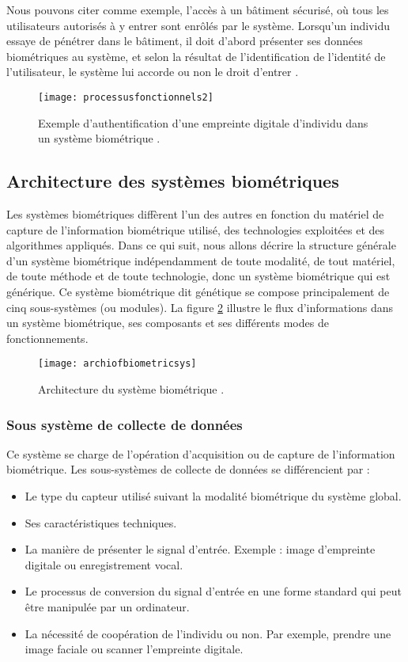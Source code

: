 \begin{itemize}
	Nous pouvons citer comme exemple, l’accès à un bâtiment sécurisé, où tous les utilisateurs autorisés à y entrer sont enrôlés par le système. Lorsqu’un individu essaye de pénétrer dans le bâtiment, il doit d’abord présenter ses données biométriques au système, et selon la résultat de l'identification de l’identité de l’utilisateur, le système lui accorde ou non le droit d’entrer \citep{meyer2009}.
	\begin{figure}[H]
		\centering
		\texttt{[image: processusfonctionnels2]}
		\caption{Exemple d'authentification d’une empreinte digitale d'individu dans un système biométrique \citep{meyer2009}.}
		\label{fig:chapitre1identification}
	\end{figure}
	
\end{itemize}
\subsection{Architecture des systèmes biométriques}
Les systèmes biométriques diffèrent l'un des autres en fonction du matériel de capture de l'information biométrique utilisé, des technologies exploitées et des algorithmes appliqués. 
Dans ce qui suit, nous allons décrire la structure générale d’un système biométrique indépendamment de toute modalité, de tout matériel, de toute méthode et de toute technologie, donc un système biométrique qui est générique. Ce système biométrique dit génétique se compose principalement de cinq sous-systèmes (ou modules)\citep{iso2006iec}. La figure \ref{fig:archiofbiometricsys} illustre le flux d'informations dans un système biométrique, ses composants et ses différents modes de fonctionnements.
\begin{figure}[H]
	\centering
	\texttt{[image: archiofbiometricsys]}
	\caption{Architecture du système biométrique \citep{iso2006iec}.}
	\label{fig:archiofbiometricsys}
\end{figure}
\subsubsection{Sous système de collecte de données }
Ce système se charge de l’opération d’acquisition ou de capture de l'information biométrique. Les sous-systèmes de collecte de données se différencient par :
\begin{itemize}
	\item Le type du capteur utilisé suivant la modalité biométrique du système global.
	\item Ses caractéristiques techniques.
	\item La manière de présenter le signal d’entrée. Exemple : image d’empreinte digitale ou enregistrement vocal.
	\item Le processus de conversion du signal d’entrée en une forme standard qui peut être manipulée par un ordinateur.
	\item La nécessité de coopération de l’individu ou non. Par exemple, prendre une image faciale ou scanner l’empreinte digitale.
\end{itemize}
